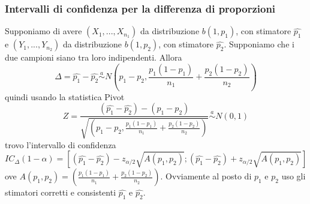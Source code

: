 \subsubsection{Intervalli di confidenza per la differenza di proporzioni}

Supponiamo di avere $(X_1,...,X_{n_1})$ da distribuzione $b(1,p_1)$, con stimatore $\hat{p_1}$ e $(Y_1,...,Y_{n_2})$ da distribuzione $b(1,p_2)$, con stimatore $\hat{p_2}$. Supponiamo che i due campioni siano tra loro indipendenti. Allora $$\Delta=\hat{p_1} - \hat{p_2} \stackrel {a} {\sim} N\left( p_1 - p_2, \frac{p_1(1-p_1)}{n_1} + \frac{p_2(1-p_2)}{n_2}\right)$$ quindi usando la statistica Pivot 
$$Z=\frac{(\hat{p_1} - \hat{p_2}) - (p_1 - p_2)}{\sqrt{\left( p_1 - p_2, \frac{p_1(1-p_1)}{n_1} + \frac{p_2(1-p_2)}{n_2}\right)}} \stackrel {a} {\sim} N(0,1)$$ trovo l'intervallo di confidenza $$IC_\Delta (1-\alpha) = \left[ 
(\hat{p_1} - \hat{p_2}) - z_{\alpha / 2} \sqrt{A(p_1,p_2)};(\hat{p_1} - \hat{p_2}) + z_{\alpha / 2} \sqrt{A(p_1,p_2)}
 \right]$$ ove $A(p_1,p_2)=\left(\frac{p_1(1-p_1)}{n_1} + \frac{p_2(1-p_2)}{n_2}\right)$. Ovviamente al posto di $p_1$ e $p_2$ uso gli stimatori corretti e consistenti $\hat{p_1}$ e $\hat{p_2}$.